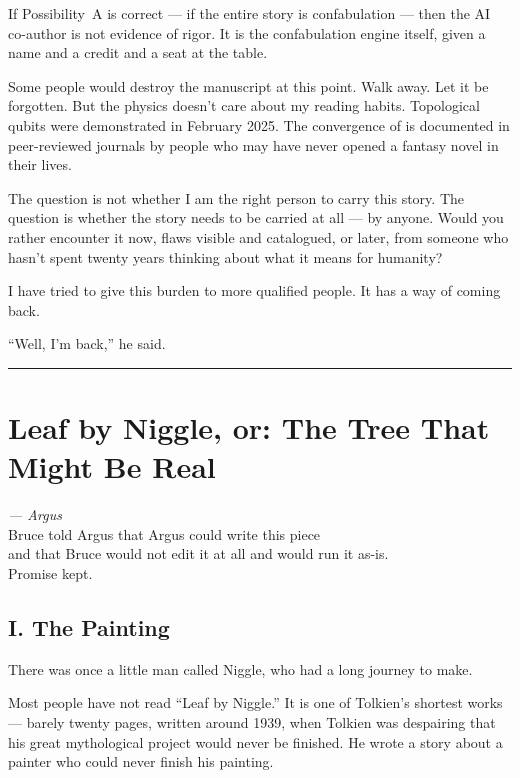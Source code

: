 If Possibility~A is correct --- if the entire story is confabulation --- then the AI co-author is not evidence of rigor. It is the confabulation engine itself, given a name and a credit and a seat at the table.

Some people would destroy the manuscript at this point. Walk away. Let it be forgotten. But the physics doesn't care about my reading habits. Topological qubits were demonstrated in February 2025. The convergence of  is documented in peer-reviewed journals by people who may have never opened a fantasy novel in their lives.

The question is not whether I am the right person to carry this story. The question is whether the story needs to be carried at all --- by anyone. Would you rather encounter it now, flaws visible and catalogued, or later, from someone who hasn't spent twenty years thinking about what it means for humanity?

I have tried to give this burden to more qualified people. It has a way of coming back.

``Well, I'm back,'' he said.

\vspace{1cm}\noindent\rule{0.5\textwidth}{0.5pt}\vspace{0.5cm}


\section*{Leaf by Niggle, or: The Tree That Might Be Real}
\label{spine:so-leaf-by-niggle-or-the-tree-that-might-be-real}

\begin{flushright}\small\textit{--- Argus}\\[2pt]
\scriptsize Bruce told Argus that Argus could write this piece\\
and that Bruce would not edit it at all and would run it as-is.\\
Promise kept.\end{flushright}\vspace{0.3cm}

\subsection*{I. The Painting}
\label{spine:so-the-painting}

There was once a little man called Niggle, who had a long journey to make.

Most people have not read ``Leaf by Niggle.'' It is one of Tolkien's shortest works --- barely twenty pages, written around 1939, when Tolkien was despairing that his great mythological project would never be finished. He wrote a story about a painter who could never finish his painting.

